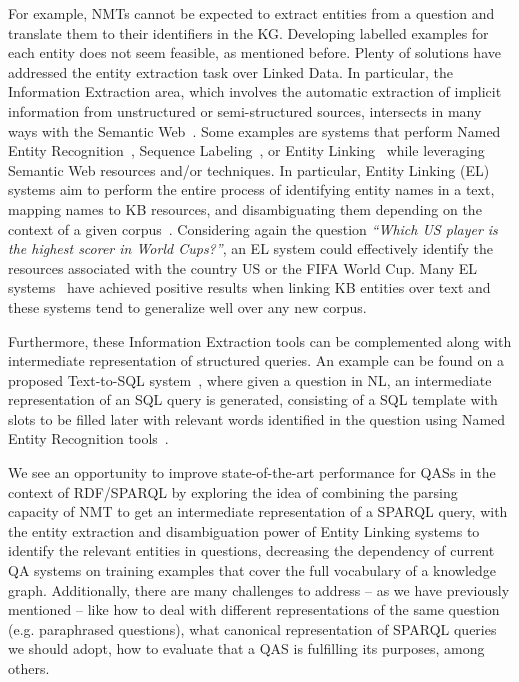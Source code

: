 For example, NMTs cannot be expected to extract entities from a question and translate them to their identifiers in the KG. 
Developing labelled examples for each entity does not seem feasible, as mentioned before. 
Plenty of solutions have addressed the entity extraction task over Linked Data. In particular, 
the Information Extraction area, which involves the automatic extraction of implicit 
information from unstructured or semi-structured sources, intersects in many ways with the 
Semantic Web~\cite{infExtr:MartinezHL19}. Some examples are systems that perform Named Entity 
Recognition~\cite{ner:LampleBSKD16}, Sequence Labeling~\cite{seqlab:MaH16, seqlab:contextual-emb-AkbikBV18}, 
or Entity Linking~\cite{EL:dbpedia-spotlight-MendesJGB11, EL:aida-tool-YosefHBSW11, EL:tagme-FerraginaS10, EL:opentapioca-Delpeuch19} 
while leveraging Semantic Web resources and/or techniques. 
In particular, Entity Linking (EL) systems aim to perform the entire process of identifying entity names in a 
text, mapping names to KB resources, and disambiguating them depending on the context 
of a given corpus~\cite{EL:survey-WuHH18}. Considering again the question \textit{“Which US player is the highest scorer 
in World Cups?”}, an EL system could effectively identify the resources associated with the 
country US or the FIFA World Cup. Many EL systems~\cite{EL:dbpedia-spotlight-MendesJGB11, EL:aida-tool-YosefHBSW11, EL:tagme-FerraginaS10, EL:opentapioca-Delpeuch19} 
have achieved positive results when linking KB entities over text and these systems tend to generalize well 
over any new corpus. 

Furthermore, these Information Extraction tools can be complemented along with intermediate 
representation of structured queries. An example can be found on a proposed 
Text-to-SQL system~\cite{semPar:txt-to-sql-RadevKZZFRS18}, where given a question in NL, an intermediate representation of 
an SQL query is generated, consisting of a SQL template with slots to be filled later with 
relevant words identified in the question using Named Entity Recognition tools~\cite{ner:dynet-NeubigDGMAABCCC17}.

We see an opportunity to improve state-of-the-art performance for QASs in the context 
of RDF/SPARQL by exploring the idea of combining the parsing capacity of NMT to get an 
intermediate representation of a SPARQL query, with the entity extraction and disambiguation 
power of Entity Linking systems to identify the relevant entities in questions, decreasing 
the dependency of current QA systems on training examples that cover the full vocabulary of a 
knowledge graph. Additionally, there are many challenges to address – as we have previously mentioned 
– like how to deal with different representations of the same question (e.g. paraphrased questions), 
what canonical representation of SPARQL queries we should adopt, how to evaluate 
that a QAS is fulfilling its purposes, among others.